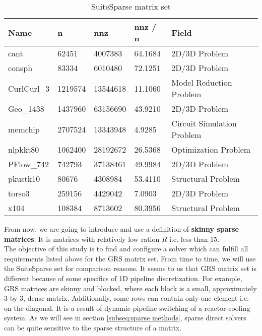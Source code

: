 \begin{table}[ht]
\centering
\begin{tabular}{|l|l|l|l|l|}
\hline
Name        & n       & nnz      & nnz / n & Field                      \\ \hline
cant        & 62451   & 4007383  & 64.1684 & 2D/3D Problem              \\ \hline
consph      & 83334   & 6010480  & 72.1251 & 2D/3D Problem              \\ \hline
CurlCurl\_3 & 1219574 & 13544618 & 11.1060 & Model Reduction Problem    \\ \hline
Geo\_1438   & 1437960 & 63156690 & 43.9210 & 2D/3D Problem              \\ \hline
memchip     & 2707524 & 13343948 & 4.9285  & Circuit Simulation Problem \\ \hline
nlpkkt80    & 1062400 & 28192672 & 26.5368 & Optimization Problem       \\ \hline
PFlow\_742  & 742793  & 37138461 & 49.9984 & 2D/3D Problem              \\ \hline
pkustk10    & 80676   & 4308984  & 53.4110 & Structural Problem         \\ \hline
torso3      & 259156  & 4429042  & 7.0903  & 2D/3D Problem              \\ \hline
x104        & 108384  & 8713602  & 80.3956 & Structural Problem         \\ \hline
\end{tabular}
\caption{SuiteSparse matrix set}
\label{table:suite-sparse-matrix-set}
\end{table}


From now, we are going to introduce and use a definition of \textbf{skinny sparse matrices}. It is matrices with relatively low  ration $R$ i.e. less than 15. \\ 


The objective of this study is to find and configure a solver which can fulfill all requirements listed above for the GRS matrix set. From time to time, we will use the SuiteSparse set for comparison reasons. It seems to us that GRS matrix set is different because of some specifics of 1D pipeline discretization. For example, GRS matrices are skinny and blocked, where each block is a small, approximately 3-by-3, dense matrix. Additionally, some rows can contain only one element i.e. on the diagonal. It is a result of dynamic pipeline switching of a reactor cooling system. As we will see in section \ref{subseq:sparse methods}, sparse direct solvers can be quite sensitive to the sparse structure of a matrix.\\


